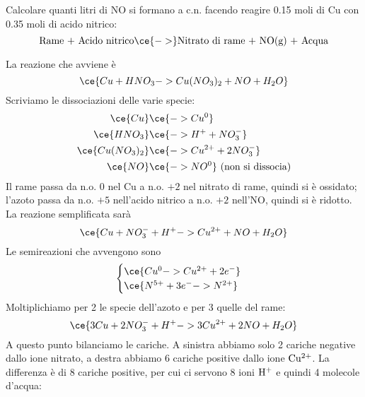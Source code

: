 \begin{esercizio}
    Calcolare quanti litri di NO si formano a c.n. facendo reagire 0.15 moli di Cu con 0.35 moli di acido nitrico:
    \begin{equation*}
        \text{Rame + Acido nitrico} \ce{->} \text{Nitrato di rame + NO(g) + Acqua}
    \end{equation*}
\end{esercizio}
\begin{soluzione}
    La reazione che avviene è
    \begin{equation*}
        \ce{Cu + HNO_3 -> Cu(NO_3)_2 + NO + H_2O}
    \end{equation*}
    Scriviamo le dissociazioni delle varie specie:
    \begin{equation*}
        \begin{split}
            \ce{Cu} & \ce{-> Cu^0}
            \\
            \ce{HNO_3} & \ce{-> H^+ + NO_3^-}
            \\
            \ce{Cu(NO_3)_2} & \ce{-> Cu^{2+} + 2NO_3^-}
            \\
            \ce{NO} & \ce{-> NO^0} \text{ (non si dissocia)}
        \end{split}
    \end{equation*}
    Il rame passa da n.o. $0$ nel Cu a n.o. $+2$ nel nitrato di rame, quindi si è ossidato; l'azoto passa da n.o. $+5$ nell'acido nitrico a n.o. $+2$ nell'NO, quindi si è ridotto.\\
    La reazione semplificata sarà
    \begin{equation*}
        \ce{Cu + NO_3^- + H^+ -> Cu^{2+} + NO + H_2O}
    \end{equation*}
    Le semireazioni che avvengono sono
    \begin{equation*}
        \begin{cases}
            \ce{Cu^0 -> Cu^{2+} + 2e^-}\\
            \ce{N^{5+} + 3e^- -> N^{2+}}
        \end{cases}
    \end{equation*}
    Moltiplichiamo per 2 le specie dell'azoto e per 3 quelle del rame:
    \begin{equation*}
        \ce{3Cu + 2NO_3^- + H^+ -> 3Cu^{2+} + 2NO + H_2O}
    \end{equation*}
    A questo punto bilanciamo le cariche. A sinistra abbiamo solo 2 cariche negative dallo ione nitrato, a destra abbiamo 6 cariche positive dallo ione $\rm Cu^{2+}$. La differenza è di 8 cariche positive, per cui ci servono 8 ioni $\rm H^+$ e quindi 4 molecole d'acqua:

\end{soluzione}
